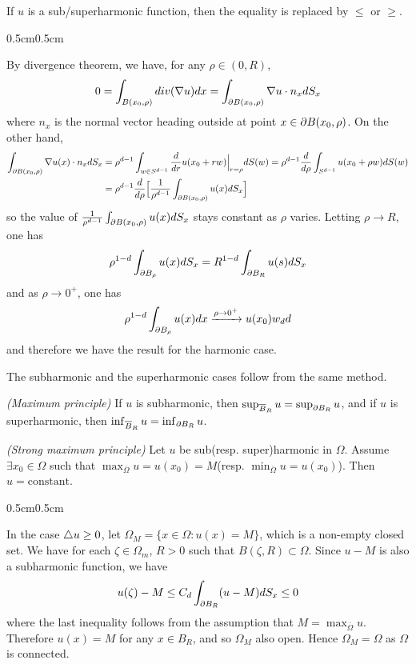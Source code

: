 \documentclass[12pt,a4paper]{article}
\newenvironment{proof}
{\begin{changemargin}{0.5cm}{0.5cm} 
	}%
	{\end{changemargin}
}
\newenvironment{p}
{\begin{proof} 
	}%
	{\end{proof}
}
\begin{document}
\quad If $u$ is a sub/superharmonic function, then the equality is replaced by $\leq$ or $\geq$.
\begin{p}
\pf By divergence theorem, we have, for any $\rho \in (0, R)$,
\begin{align*}
0= \int_{B(x_0, \rho)} div(\nabla u) dx = \int_{\partial B(x_0, \rho)} \nabla u \cdot n_x dS_x
\end{align*}
where $n_x$ is the normal vector heading outside at point $x\in \partial B(x_0, \rho)$. On the other hand, \begin{align*}
\int_{\partial B(x_0, \rho)} \nabla u(x) \cdot n_x dS_x & = \rho^{d-1} \int_{w \in S^{d-1} } \frac{d}{dr} u(x_0 + rw)\Big|_{r=\rho} dS(w) = \rho^{d-1} \frac{d}{d\rho} \int_{ S^{d-1} } u(x_0 + \rho w) dS(w) \\
& = \rho^{d-1} \frac{d}{d\rho} \Big[ \frac{1}{\rho^{d-1}} \int_{\partial B(x_0 , \rho)} u(x) dS_x \Big]
\end{align*}
so the value of $\frac{1}{\rho^{d-1}} \int_{\partial B(x_0 , \rho)} u(x) dS_x$ stays constant as $\rho$ varies. Letting $\rho \rightarrow R$, one has
\begin{align*}
\rho^{1-d} \int_{\partial B_{\rho}} u(x) dS_x = R^{1-d} \int_{\partial B_R} u(s) dS_x
\end{align*}
and as $\rho \rightarrow 0^+$, one has
\begin{align*}
\rho^{1-d} \int_{\partial B_{\rho}} u(x) dx \xrightarrow{\rho \rightarrow 0^+} u(x_0) w_d d
\end{align*}
and therefore we have the result for the harmonic case.

\quad The subharmonic and the superharmonic cases follow from the same method.

\eop
\end{p}
\s

 \emph{(Maximum principle)} If $u$ is subharmonic, then $\sup_{\overline{B}_R} u = \sup_{\partial B_R} u$, and if $u$ is superharmonic, then $\inf_{\overline{B}_R} u = \inf_{\partial B_R} u$.
\s

 \emph{(Strong maximum principle)} Let $u$ be sub(resp. super)harmonic in $\Omega$. Assume $\exists x_0 \in \Omega$ such that $\max_{\bar{\Omega}} u = u(x_0) = M$(resp. $\min_{\bar{\Omega}} u = u(x_0)$). Then $u = \text{constant}$.
\begin{p}
\pf In the case $\triangle u \geq 0$, let $\Omega_M = \{x\in \Omega : u(x) = M \}$, which is a non-empty closed set. We have for each $\zeta \in \Omega_m$, $R>0$ such that $B(\zeta, R) \subset \Omega$. Since $u-M$ is also a subharmonic function, we have 
\begin{align*}
u(\zeta) -M \leq C_d \int_{\partial B_R} (u-M) dS_x \leq 0
\end{align*}
where the last inequality follows from the assumption that $M = \max_{\bar{\Omega}} u$. Therefore $u(x) =M$ for any $x \in B_R$, and so $\Omega_M$ also open. Hence $\Omega_M = \Omega$ as $\Omega$ is connected.

\eop
\end{p}
\s
\end{document}
